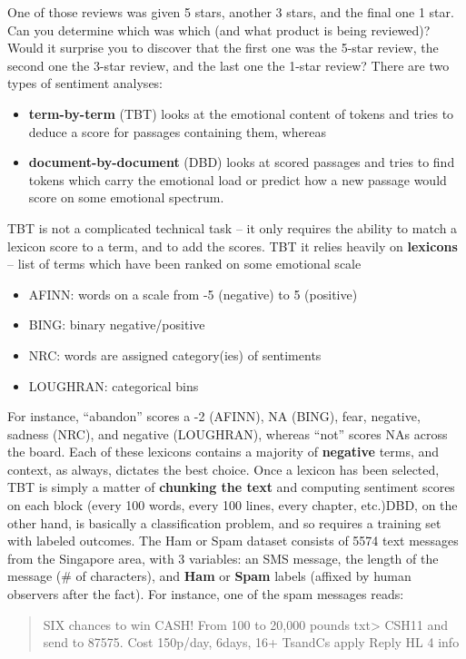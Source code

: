 One of those reviews was given 5 stars, another 3 stars, and the final one 1 star. Can you determine which was which (and what product is being reviewed)? Would it surprise you to discover that the first one was the 5-star review, the second one the 3-star review, and the last one the 1-star review? 
\newl There are two types of sentiment analyses:
\begin{itemize}[noitemsep]
\item \textbf{term-by-term} (TBT) looks at the emotional content of tokens and tries to deduce a score for passages containing them, whereas
\item \textbf{document-by-document} (DBD) looks at scored passages and tries to find tokens which carry the emotional load or predict how a new passage would score on some emotional spectrum.
\end{itemize}
TBT is not a complicated technical task -- it only requires the ability to match a lexicon score to a term, and to add the scores. TBT it  relies heavily on \textbf{lexicons} -- list of terms which have been ranked on some emotional scale
\begin{itemize}[noitemsep]
\item AFINN: words on a scale from -5 (negative) to 5 (positive)
\item BING: binary negative/positive
\item NRC: words are assigned category(ies) of sentiments
\item LOUGHRAN: categorical bins
\end{itemize}
For instance, ``abandon'' scores a -2 (AFINN), NA (BING), fear, negative, sadness (NRC), and negative (LOUGHRAN), whereas ``not'' scores NAs across the board. Each of these lexicons contains a majority of \textbf{negative} terms, and context, as always, dictates the best choice. Once a lexicon has been selected, TBT is simply a matter of \textbf{chunking the text} and computing sentiment scores on each block (every 100 words, every 100 lines, every chapter, etc.)\newl DBD, on the other hand,  is basically a classification problem, and so requires a training set with labeled outcomes. The Ham or Spam dataset consists of 5574 text messages from the Singapore area, with 3 variables: an SMS message, the length of the message (\# of characters), and \textbf{Ham} or \textbf{Spam} labels (affixed by human observers after the fact). For instance, one of the spam messages reads: 
\begin{quote}
SIX chances to win CASH! From 100 to 20,000 pounds txt> CSH11 and send to 87575. Cost 150p/day, 6days, 16+ TsandCs apply Reply HL 4 info
\end{quote}
